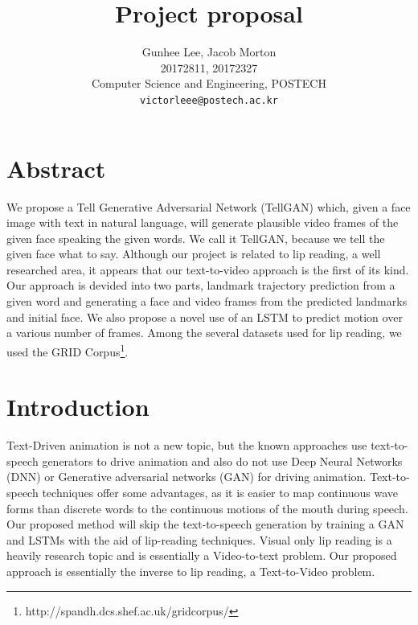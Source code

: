 \documentclass[10pt,twocolumn,letterpaper]{article}
\begin{document}
\title{Project proposal}

\author{Gunhee Lee, Jacob Morton\\
20172811, 20172327\\
Computer Science and Engineering, POSTECH\\
{\tt\small victorleee@postech.ac.kr}
}


\maketitle


\section{Abstract}

 We propose a Tell Generative Adversarial Network (TellGAN) which, given a face image with text in natural language, will generate plausible video frames of the given face speaking the given words. We call it TellGAN, because we tell the given face what to say. Although our project is related to lip reading, a well researched area, it appears that our text-to-video approach is the first of its kind. Our approach is devided into two parts, landmark trajectory prediction from a given word and generating a face and video frames from the predicted landmarks and initial face. We also propose a novel use of an LSTM to predict motion over a various number of frames. Among the several datasets used for lip reading, we used the GRID Corpus\footnote{http://spandh.dcs.shef.ac.uk/gridcorpus/}.
 
\section{Introduction}
 Text-Driven animation is not a new topic, but the known approaches use text-to-speech generators to drive animation and also do not use Deep Neural Networks (DNN) or Generative adversarial networks (GAN) for driving animation. Text-to-speech techniques offer some advantages, as it is easier to map continuous wave forms than discrete words to the continuous motions of the mouth during speech. Our proposed method will skip the text-to-speech generation by training a GAN and LSTMs with the aid of lip-reading techniques. Visual only lip reading is a heavily research topic and is essentially a Video-to-text problem. Our proposed approach is essentially the inverse to lip reading, a Text-to-Video problem.
\end{document}

